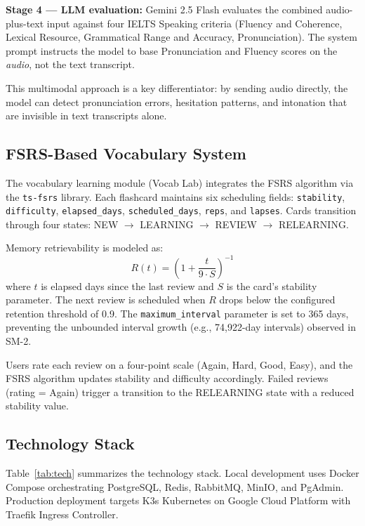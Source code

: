 \documentclass[conference]{IEEEtran}
\begin{document}
\textbf{Stage 4 --- LLM evaluation:} Gemini 2.5 Flash evaluates the combined audio-plus-text input against four IELTS Speaking criteria (Fluency and Coherence, Lexical Resource, Grammatical Range and Accuracy, Pronunciation). The system prompt instructs the model to base Pronunciation and Fluency scores on the \emph{audio}, not the text transcript.

This multimodal approach is a key differentiator: by sending audio directly, the model can detect pronunciation errors, hesitation patterns, and intonation that are invisible in text transcripts alone.

\subsection{FSRS-Based Vocabulary System}

The vocabulary learning module (Vocab Lab) integrates the FSRS algorithm via the \texttt{ts-fsrs} library. Each flashcard maintains six scheduling fields: \texttt{stability}, \texttt{difficulty}, \texttt{elapsed\_days}, \texttt{scheduled\_days}, \texttt{reps}, and \texttt{lapses}. Cards transition through four states: NEW $\rightarrow$ LEARNING $\rightarrow$ REVIEW $\rightarrow$ RELEARNING.

Memory retrievability is modeled as:
\begin{equation}
    R(t) = \left(1 + \frac{t}{9 \cdot S}\right)^{-1}
\end{equation}
where $t$ is elapsed days since the last review and $S$ is the card's stability parameter. The next review is scheduled when $R$ drops below the configured retention threshold of 0.9. The \texttt{maximum\_interval} parameter is set to 365 days, preventing the unbounded interval growth (e.g., 74,922-day intervals) observed in SM-2.

Users rate each review on a four-point scale (Again, Hard, Good, Easy), and the FSRS algorithm updates stability and difficulty accordingly. Failed reviews (rating = Again) trigger a transition to the RELEARNING state with a reduced stability value.

\subsection{Technology Stack}

Table~\ref{tab:tech} summarizes the technology stack. Local development uses Docker Compose orchestrating PostgreSQL, Redis, RabbitMQ, MinIO, and PgAdmin. Production deployment targets K3s Kubernetes on Google Cloud Platform with Traefik Ingress Controller.
\end{document}

